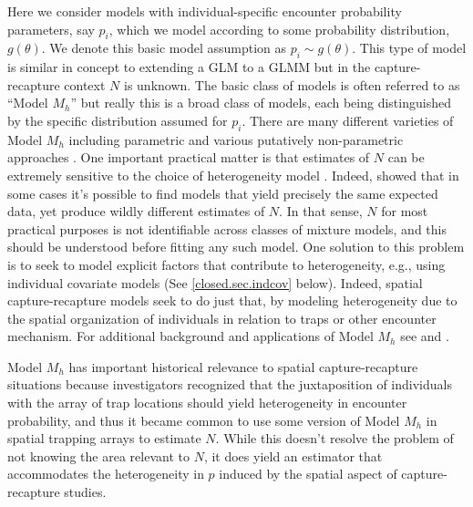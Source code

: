 Here we consider models with individual-specific encounter probability
parameters, say $p_{i}$, which we model according to some probability
distribution, $g(\theta)$. We denote this basic model assumption as
$p_{i} \sim g(\theta)$. This type of model is similar in concept to
extending a GLM to a GLMM but in the capture-recapture context $N$ is
unknown.  The basic class of models is often referred to as ``Model
$M_h$'' but really this is a broad class of models, each being
distinguished by the specific distribution assumed for $p_{i}$.  There
are many different varieties of Model $M_{h}$ including parametric and
various putatively non-parametric approaches
\citep{burnham_overton:1978, norris_pollock:1996, pledger:2000}. One
important practical matter is that estimates of $N$ can be extremely
sensitive to the choice of heterogeneity model
\citep{fienberg_etal:1999, dorazio_royle:2003, link:2003}. Indeed,
\citet{link:2003} showed that in some cases it's possible to find
models that yield precisely the same expected data, yet produce wildly
different estimates of $N$. In that sense, $N$ for most practical
purposes is not identifiable across classes of mixture models, and
this should be understood before fitting any such model. One solution
to this problem is to seek to model explicit factors that contribute
to heterogeneity, e.g., using individual covariate models (See
\ref{closed.sec.indcov} below). Indeed, spatial capture-recapture
models seek to do just that, by modeling heterogeneity due to the
spatial organization of individuals in relation to traps or other
encounter mechanism.  For additional background and applications of
Model $M_{h}$ see \citet[][chapt. 6]{royle_dorazio:2008} and
\citet[][chapt. 6]{kery_schaub:2011}.

Model $M_{h}$ has important historical relevance to spatial
capture-recapture situations \citep{karanth:1995} because
investigators recognized that the juxtaposition of individuals with
the array of trap locations should yield heterogeneity in encounter
probability, and thus it became common to use some version of Model $M_h$
in spatial trapping arrays to estimate $N$.  While this doesn't
resolve the problem of not knowing the area relevant to $N$, it does
yield an estimator that accommodates the heterogeneity in $p$ induced
by the spatial aspect of capture-recapture studies.

